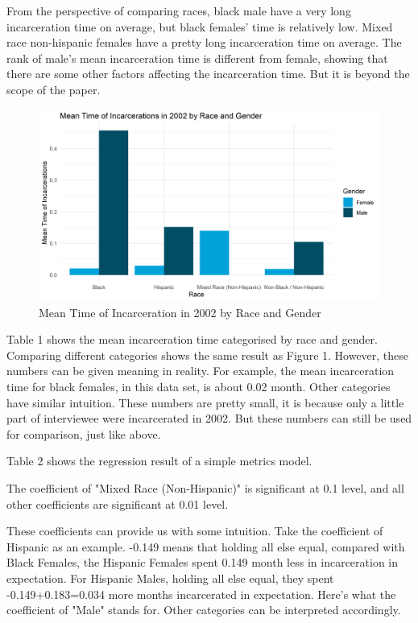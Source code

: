 \documentclass{article}
\begin{document}
From the perspective of comparing races, black male have a very long incarceration time on average, but black females' time is relatively low. Mixed race non-hispanic females have a pretty long incarceration time on average. The rank of male's mean incarceration time is different from female, showing that there are some other factors affecting the incarceration time. But it is beyond the scope of the paper.


\begin{figure}[H]
    \begin{center}
        \includegraphics[width=.85\textwidth]{incarcerations_by_racegender}
    \end{center}
    \caption{Mean Time of Incarceration in 2002 by Race and Gender}
    \label{fig:graph}
\end{figure}




Table 1 shows the mean incarceration time categorised by race and gender. Comparing different categories shows the same result as Figure 1. However, these numbers can be given meaning in reality. For example, the mean incarceration time for black females, in this data set, is about 0.02 month. Other categories have similar intuition. These numbers are pretty small, it is because only a little part of interviewee were incarcerated in 2002. But these numbers can still be used for comparison, just like above.

Table 2 shows the regression result of a simple metrics model. 

The coefficient of "Mixed Race (Non-Hispanic)" is significant at 0.1 level, and all other coefficients are significant at 0.01 level. 

These coefficients can provide us with some intuition. Take the coefficient of Hispanic as an example. -0.149 means that holding all else equal, compared with Black Females, the Hispanic Females spent 0.149 month less in incarceration in expectation. For Hispanic Males, holding all else equal, they spent -0.149+0.183=0.034 more months incarcerated in expectation. Here's what the coefficient of "Male" stands for. Other categories can be interpreted accordingly.


\end{document}
